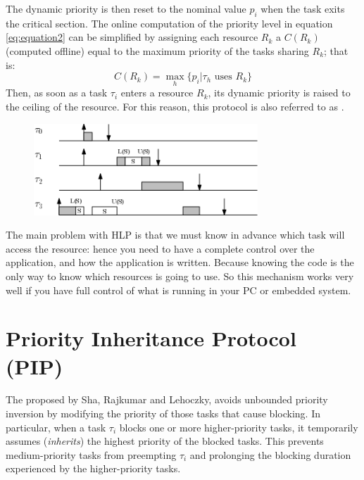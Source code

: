 The dynamic priority is then reset to the nominal value $p_i$ when the task exits the critical section. The online computation of the priority level in equation \ref{eq:equation2} can be simplified by assigning each resource $R_k$ a  $C(R_k)$ (computed offline) equal to the maximum priority of the tasks sharing $R_k$; that is:
\[C(R_k) = \max_h\{p_i | \tau_h \text{ uses } R_k\}\]
Then, as soon as a task $\tau_i$ enters a resource $R_k$, its dynamic priority is raised to the ceiling of the resource. For this reason, this protocol is also referred to as .

\begin{figure}[!h]
    \centering
    \includegraphics[width =0.75\textwidth]{images/image08.png}
\end{figure}
The main problem with HLP is that we must know in advance which task will access the resource: hence you need to have a complete control over the application, and how the application is written. Because knowing the code is the only way to know which resources is going to use. So this mechanism works very well if you have full control of what is running in your PC or embedded system.

\section{Priority Inheritance Protocol (PIP)}
The  proposed by Sha, Rajkumar and Lehoczky, avoids unbounded priority inversion by modifying the priority of those tasks that cause blocking. In particular, when a task $\tau_i$ blocks one or more higher-priority tasks, it temporarily assumes (\textit{inherits}) the highest priority of the blocked tasks. This prevents medium-priority tasks from preempting $\tau_i$ and prolonging the blocking duration experienced by the higher-priority tasks.

